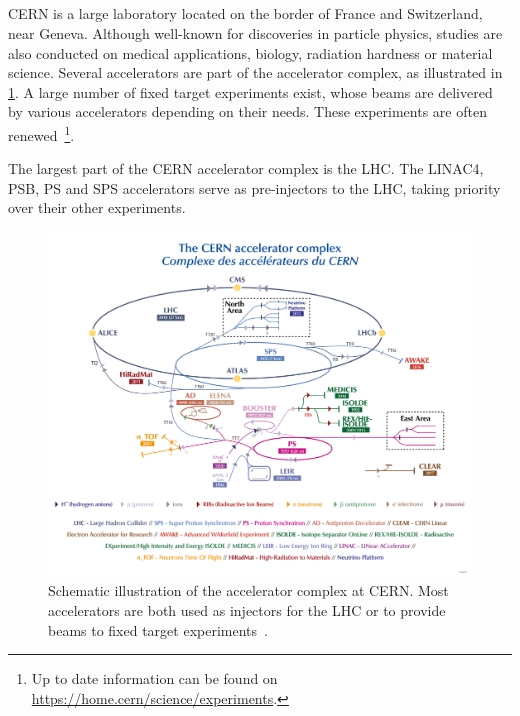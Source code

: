 
\subsection{}

CERN is a large laboratory located on the border of France and Switzerland, near Geneva. Although
well-known for discoveries in particle physics, studies are also conducted on medical applications,
biology, radiation hardness or material science.
Several accelerators are part of the accelerator complex, as illustrated in
\cref{fig:introduction:cern_complex}. A large number of fixed target experiments exist, whose
beams are delivered by various accelerators depending on their needs. These experiments are often
renewed~\footnote{Up to date information can be found on
\href{https://home.cern/science/experiments}{https://home.cern/science/experiments}.}.

The largest part of the CERN accelerator complex is the LHC. The LINAC4, PSB, PS and SPS
accelerators serve as pre-injectors to the LHC, taking priority over their other experiments.

\begin{figure}[!htb]
    \centering
    \includegraphics[width=1\textwidth]{images/cern_complex.png}
    \caption{Schematic illustration of the accelerator complex at CERN. Most accelerators are both
    used as injectors for the LHC or to provide beams to fixed target
    experiments~\cite{noauthor_cern_2022}.}
    \label{fig:introduction:cern_complex}
\end{figure}


